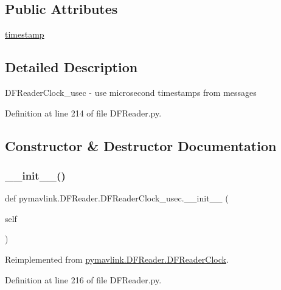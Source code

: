 \subsection*{Public Attributes}
\begin{DoxyCompactItemize}
\item 
\mbox{\hyperlink{classpymavlink_1_1DFReader_1_1DFReaderClock__usec_a795cbd1e1eb2d5efc767ba1fa4abeab5}{timestamp}}
\end{DoxyCompactItemize}


\subsection{Detailed Description}
\begin{DoxyVerb}DFReaderClock_usec - use microsecond timestamps from messages\end{DoxyVerb}
 

Definition at line 214 of file D\+F\+Reader.\+py.



\subsection{Constructor \& Destructor Documentation}
\mbox{\label{classpymavlink_1_1DFReader_1_1DFReaderClock__usec_a392d07c4a8ea07255cd30ecb41322e7c}} 
\subsubsection{\texorpdfstring{\_\_init\_\_()}{\_\_init\_\_()}}
{\footnotesize\ttfamily def pymavlink.\+D\+F\+Reader.\+D\+F\+Reader\+Clock\+\_\+usec.\+\_\+\+\_\+init\+\_\+\+\_\+ (\begin{DoxyParamCaption}\item[{}]{self }\end{DoxyParamCaption})}



Reimplemented from \mbox{\hyperlink{classpymavlink_1_1DFReader_1_1DFReaderClock_a99d4363951b5ef9866cbd021ca4dd80f}{pymavlink.\+D\+F\+Reader.\+D\+F\+Reader\+Clock}}.



Definition at line 216 of file D\+F\+Reader.\+py.



